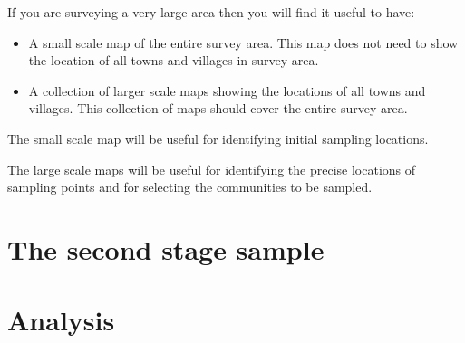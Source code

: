 \documentclass[12pt,a4paper]{book}
\theoremstyle{definition}
\theoremstyle{definition}
\theoremstyle{definition}
\theoremstyle{remark}
\begin{document}
If you are surveying a very large area then you will find it useful to
have:

\begin{itemize}
\item
  A small scale map of the entire survey area. This map does not need to
  show the location of all towns and villages in survey area.
\item
  A collection of larger scale maps showing the locations of all towns
  and villages. This collection of maps should cover the entire survey
  area.
\end{itemize}

The small scale map will be useful for identifying initial sampling
locations.

The large scale maps will be useful for identifying the precise
locations of sampling points and for selecting the communities to be
sampled.

\hypertarget{stage2}{%
\chapter{The second stage sample}\label{stage2}}

\hypertarget{analysis}{%
\chapter{Analysis}\label{analysis}}


\end{document}
